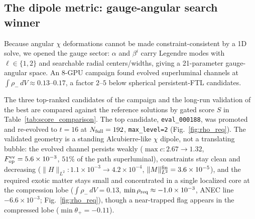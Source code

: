 \documentclass[twocolumn,floatfix,aps,prd,nofootinbib]{revtex4-2}
\begin{document}
\subsection{The dipole metric: gauge-angular search winner}

Because angular $\chi$ deformations cannot be made constraint-consistent by a 1D solve, we opened the gauge sector: $\alpha$ and $\beta^i$ carry Legendre modes with $\ell\in\{1,2\}$ and searchable radial centers/widths, giving a 21-parameter gauge-angular space.  An 8-GPU campaign found evolved superluminal channels at $\int\!\rho_{-}\,dV\approx0.13$--$0.17$, a factor $2$--$5$ below spherical persistent-FTL candidates.

The three top-ranked candidates of the campaign and the long-run validation of the best are compared against the reference solutions by gated score $S$ in Table~\ref{tab:score_comparison}.  The top candidate, \texttt{eval\_000188}, was promoted and re-evolved to $t=16$ at $N_{\rm full}=192$, \texttt{max\_level=2} (Fig.~\ref{fig:rho_req}).  The validated geometry is a standing Alcubierre-like $\chi$ dipole, not a translating bubble: the evolved channel persists weakly ($\max c:2.67\!\to\!1.32$, $F_{\rm op}^{\rm ev}=5.6\times10^{-3}$, $51\%$ of the path superluminal), constraints stay clean and decreasing ($\|H\|_{L^2}:1.1\times10^{-3}\!\to\!4.2\times10^{-4}$, $\|M\|_{L^2}^{\rm fin}=3.6\times10^{-5}$), and the required exotic matter stays small and concentrated in a single localized core at the compression lobe ($\int\rho_-\,dV=0.13$, $\min\rho_{\rm req}\approx-1.0\times10^{-3}$, ANEC line $-6.6\times10^{-3}$; Fig.~\ref{fig:rho_req}), though a near-trapped flag appears in the compressed lobe ($\min\theta_+=-0.11$).
\end{document}
